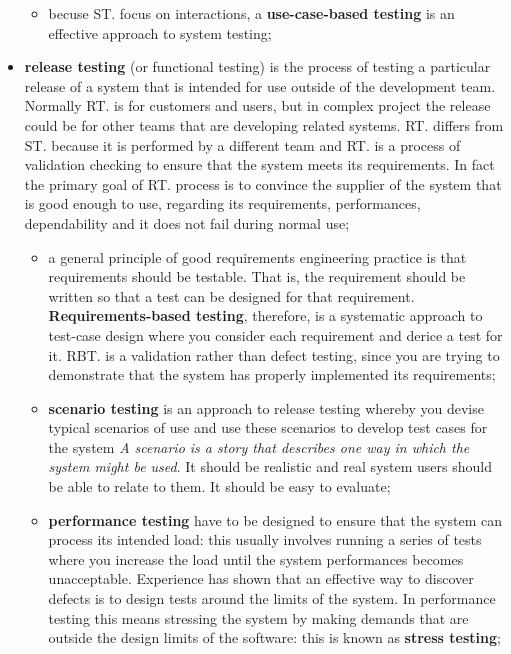 \documentclass[oneside]{article}
\begin{document}
\begin{itemize}
\begin{itemize}
        \item becuse ST. focus on interactions, a \textbf{use-case-based testing} is an effective approach to system testing;
    \end{itemize}
    
    \item \textbf{release testing} (or functional testing) is the process of testing a particular release of a system that is intended for use outside of the development team. Normally RT. is for customers and users, but in complex project the release could be for other teams that are developing related systems. RT. differs from ST.  because it is performed by a different team and RT. is a process of validation checking to ensure that the system meets its requirements. In fact the primary goal of RT. process is to convince the supplier of the system that is good enough to use, regarding its requirements, performances, dependability and it does not fail during normal use;
    
        \begin{itemize}
    
            \item a general principle of good requirements engineering practice is that requirements should be testable. That is, the requirement should be written so that a test can be designed for that requirement. \textbf{Requirements-based testing}, therefore, is a systematic approach to test-case design where you consider each requirement and derice a test for it. RBT. is a validation rather than defect testing, since you are trying to demonstrate that the system has properly implemented its requirements;
            
            \item \textbf{scenario testing} is an approach to release testing whereby you devise typical scenarios of use and use these scenarios to develop test cases for the system \textit{A scenario is a story that describes one way in which the system might be used}. It should be realistic and real system users should be able to relate to them. It should be easy to evaluate;
            
            \item \textbf{performance testing} have to be designed to ensure that the system can process its intended load: this usually involves running a series of tests where you increase the load until the system performances becomes unacceptable. Experience has shown that an effective way to discover defects is to design tests around the limits of the system. In performance testing this means stressing the system by making demands that are outside the design limits of the software: this is known as \textbf{stress testing};
            

\end{itemize}
\end{itemize}
\end{document}
